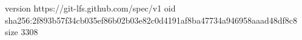 version https://git-lfs.github.com/spec/v1
oid sha256:2f893b57f34cb035ef86b02b03e82c0d4191af8ba47734a946958aaad48df8c8
size 3308
